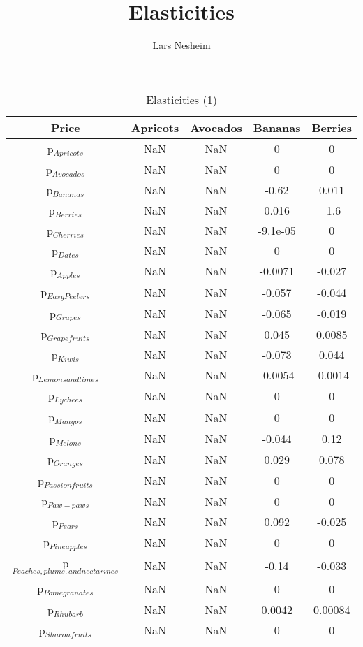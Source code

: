 \documentclass[11pt]{article}
\title{Elasticities}
\author{Lars Nesheim}
\date{}
\begin{document}
\maketitle
\begin{table}[h]
\caption{Elasticities (1)}
\label{Table: elasticities 1}
\begin{center}
\begin{tabular}{ccccc}
Price & Apricots & Avocados & Bananas & Berries \\ \hline
p$_{Apricots}$ & NaN & NaN & 0 & 0 \\ 
p$_{Avocados}$ & NaN & NaN & 0 & 0 \\ 
p$_{Bananas}$ & NaN & NaN & -0.62 & 0.011 \\ 
p$_{Berries}$ & NaN & NaN & 0.016 & -1.6 \\ 
p$_{Cherries}$ & NaN & NaN & -9.1e-05 & 0 \\ 
p$_{Dates}$ & NaN & NaN & 0 & 0 \\ 
p$_{Apples}$ & NaN & NaN & -0.0071 & -0.027 \\ 
p$_{Easy Peelers}$ & NaN & NaN & -0.057 & -0.044 \\ 
p$_{Grapes}$ & NaN & NaN & -0.065 & -0.019 \\ 
p$_{Grapefruits}$ & NaN & NaN & 0.045 & 0.0085 \\ 
p$_{Kiwis}$ & NaN & NaN & -0.073 & 0.044 \\ 
p$_{Lemons and limes}$ & NaN & NaN & -0.0054 & -0.0014 \\ 
p$_{Lychees}$ & NaN & NaN & 0 & 0 \\ 
p$_{Mangos}$ & NaN & NaN & 0 & 0 \\ 
p$_{Melons}$ & NaN & NaN & -0.044 & 0.12 \\ 
p$_{Oranges}$ & NaN & NaN & 0.029 & 0.078 \\ 
p$_{Passion fruits}$ & NaN & NaN & 0 & 0 \\ 
p$_{Paw-paws}$ & NaN & NaN & 0 & 0 \\ 
p$_{Pears}$ & NaN & NaN & 0.092 & -0.025 \\ 
p$_{Pineapples}$ & NaN & NaN & 0 & 0 \\ 
p$_{Peaches, plums, and nectarines}$ & NaN & NaN & -0.14 & -0.033 \\ 
p$_{Pomegranates}$ & NaN & NaN & 0 & 0 \\ 
p$_{Rhubarb}$ & NaN & NaN & 0.0042 & 0.00084 \\ 
p$_{Sharon fruits}$ & NaN & NaN & 0 & 0 \\ 
\end{tabular}
\end{center}
\end{table}
\end{document}
